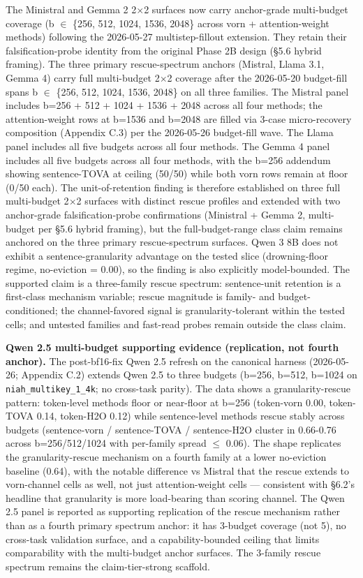 \documentclass[10pt]{article}
\begin{document}
The Ministral and Gemma 2 2$\times$2 surfaces now carry anchor-grade
multi-budget coverage (b $\in$ \{256, 512, 1024, 1536, 2048\} across vorn
+ attention-weight methods) following the 2026-05-27 multistep-fillout
extension. They retain their falsification-probe identity from the
original Phase 2B design (\S{}5.6 hybrid framing). The three primary
rescue-spectrum anchors (Mistral, Llama 3.1, Gemma 4) carry full
multi-budget 2$\times$2 coverage after the 2026-05-20 budget-fill spans b $\in$
\{256, 512, 1024, 1536, 2048\} on all three families. The Mistral panel includes b=256 +
512 + 1024 + 1536 + 2048 across all four methods; the attention-weight
rows at b=1536 and b=2048 are filled via 3-case micro-recovery
composition (Appendix C.3) per the 2026-05-26 budget-fill wave.
The Llama panel includes all five budgets across all four methods. The
Gemma 4 panel includes all five budgets across all four methods, with
the b=256 addendum showing sentence-TOVA at ceiling (50/50) while both
vorn rows remain at floor (0/50 each). The unit-of-retention finding is
therefore established on three full multi-budget 2$\times$2 surfaces with
distinct rescue profiles and extended with two anchor-grade
falsification-probe confirmations (Ministral + Gemma 2, multi-budget
per \S{}5.6 hybrid framing), but the full-budget-range class claim
remains anchored on the three primary rescue-spectrum surfaces. Qwen 3
8B does not exhibit a sentence-granularity advantage on the tested slice
(drowning-floor regime, no-eviction = 0.00), so the finding is also
explicitly model-bounded. The supported claim is a three-family rescue
spectrum: sentence-unit retention is a first-class mechanism variable;
rescue magnitude is family- and budget-conditioned; the channel-favored
signal is granularity-tolerant within the tested cells; and untested
families and fast-read probes remain outside the class claim.

\textbf{Qwen 2.5 multi-budget supporting evidence (replication, not
fourth anchor).} The post-bf16-fix Qwen 2.5 refresh on the canonical
harness (2026-05-26; Appendix C.2) extends Qwen 2.5 to three budgets
(b=256, b=512, b=1024 on \texttt{niah\_multikey\_1\_4k}; no cross-task
parity). The data shows a granularity-rescue pattern: token-level
methods floor or near-floor at b=256 (token-vorn 0.00, token-TOVA 0.14,
token-H2O 0.12) while sentence-level methods rescue stably across
budgets (sentence-vorn / sentence-TOVA / sentence-H2O cluster in
0.66-0.76 across b=256/512/1024 with per-family spread $\leq$ 0.06). The
shape replicates the granularity-rescue mechanism on a fourth family at
a lower no-eviction baseline (0.64), with the notable difference vs
Mistral that the rescue extends to vorn-channel cells as well, not just
attention-weight cells --- consistent with \S{}6.2's headline that
granularity is more load-bearing than scoring channel. The Qwen 2.5
panel is reported as supporting replication of the rescue mechanism
rather than as a fourth primary spectrum anchor: it has 3-budget
coverage (not 5), no cross-task validation surface, and a
capability-bounded ceiling that limits comparability with the
multi-budget anchor surfaces. The 3-family rescue spectrum remains the
claim-tier-strong scaffold.
\end{document}
